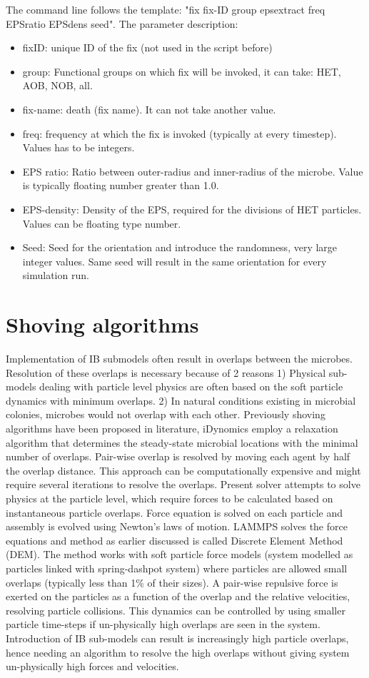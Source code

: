 \documentclass[11pt,a4paper,openright]{article}
\begin{document}
The command line follows the template: "fix fix-ID group epsextract freq EPSratio EPSdens seed". The parameter description:
\begin{itemize}
\item fixID: unique ID of the fix (not used in the script before)
\item group: Functional groups on which fix will be invoked, it can take: HET, AOB, NOB, all.
\item fix-name: death (fix name). It can not take another value.
\item freq: frequency at which the fix is invoked (typically at every timestep). Values has to be integers.
\item EPS ratio: Ratio between outer-radius and inner-radius of the microbe. Value is typically floating number greater than 1.0.
\item EPS-density: Density of the EPS, required for the divisions of HET particles. Values can be floating type number.
\item Seed: Seed for the orientation and introduce the randomness, very large integer values. Same seed will result in the same orientation for every simulation run.
\end{itemize}


\section{Shoving algorithms}
Implementation of IB submodels often result in overlaps between the microbes. Resolution of these overlaps is necessary because of 2 reasons 1) Physical sub-models dealing with particle level physics are often based on the soft particle dynamics with minimum overlaps. 2) In natural conditions existing in microbial colonies, microbes would not overlap with each other. Previously shoving algorithms have been proposed in literature, iDynomics employ a relaxation algorithm that determines the steady-state microbial locations with the minimal number of overlaps. Pair-wise overlap is resolved by moving each agent by half the overlap distance. This approach can be computationally expensive and might require several iterations to resolve the overlaps. Present solver attempts to solve physics at the particle level, which require forces to be calculated based on instantaneous particle overlaps. Force equation is solved on each particle and assembly is evolved using Newton's laws of motion. LAMMPS solves the force equations and method as earlier discussed is called Discrete Element Method (DEM). The method works with soft particle force models (system modelled as particles linked with spring-dashpot system) where particles are allowed small overlaps (typically less than 1\% of their sizes). A pair-wise repulsive force is exerted on the particles as a function of the overlap and the relative velocities, resolving particle collisions. This dynamics can be controlled by using smaller particle time-steps if un-physically high overlaps are seen in the system. Introduction of IB sub-models can result is increasingly high particle overlaps, hence needing an algorithm to resolve the high overlaps without giving system un-physically high forces and velocities. 
\end{document}
